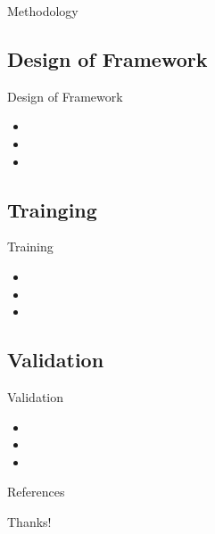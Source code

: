 \documentclass{beamer}
\begin{document}
\begin{section}{Methodology}                     %
    \subsection{Design of Framework}             %
    \begin{frame}{Design of Framework}
        \begin{itemize}
            \item
            \item
            \item
        \end{itemize}
    \end{frame}

    \subsection{Trainging}                       %
    \begin{frame}{Training}
        \begin{itemize}
            \item
            \item
            \item
        \end{itemize}
    \end{frame}

    \subsection{Validation}                      %
    \begin{frame}{Validation}
        \begin{itemize}
            \item
            \item
            \item
        \end{itemize}
    \end{frame}
\end{section}

\begin{frame}{References}
    \printbibliography
\end{frame}

\begin{frame}{}
    \begin{center}
    \huge{Thanks!}
    \end{center}
\end{frame}
\end{document}
